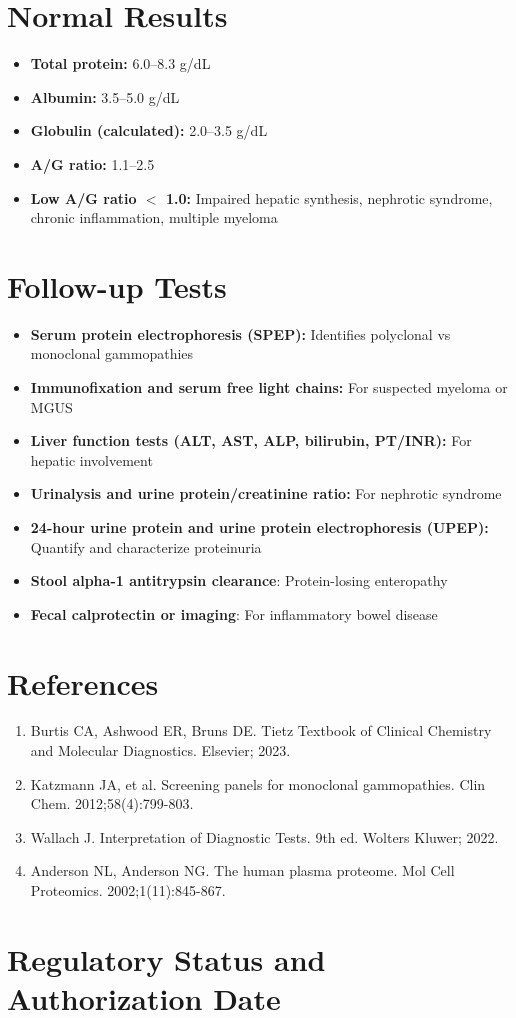 \section*{Normal Results}
\begin{itemize}
  \item \textbf{Total protein:} 6.0--8.3 g/dL
  \item \textbf{Albumin:} 3.5--5.0 g/dL
  \item \textbf{Globulin (calculated):} 2.0--3.5 g/dL
  \item \textbf{A/G ratio:} 1.1--2.5
  \item \textbf{Low A/G ratio $<$ 1.0:} Impaired hepatic synthesis, nephrotic syndrome, chronic inflammation, multiple myeloma
\end{itemize}

\section*{Follow-up Tests}
\begin{itemize}
  \item \textbf{Serum protein electrophoresis (SPEP):} Identifies polyclonal vs monoclonal gammopathies
  \item \textbf{Immunofixation and serum free light chains:} For suspected myeloma or MGUS
  \item \textbf{Liver function tests (ALT, AST, ALP, bilirubin, PT/INR):} For hepatic involvement
  \item \textbf{Urinalysis and urine protein/creatinine ratio:} For nephrotic syndrome
  \item \textbf{24-hour urine protein and urine protein electrophoresis (UPEP):} Quantify and characterize proteinuria
  \item \textbf{Stool alpha-1 antitrypsin clearance}: Protein-losing enteropathy
  \item \textbf{Fecal calprotectin or imaging}: For inflammatory bowel disease
\end{itemize}

\section*{References}
\begin{enumerate}
  \item Burtis CA, Ashwood ER, Bruns DE. Tietz Textbook of Clinical Chemistry and Molecular Diagnostics. Elsevier; 2023.
  \item Katzmann JA, et al. Screening panels for monoclonal gammopathies. Clin Chem. 2012;58(4):799-803.
  \item Wallach J. Interpretation of Diagnostic Tests. 9th ed. Wolters Kluwer; 2022.
  \item Anderson NL, Anderson NG. The human plasma proteome. Mol Cell Proteomics. 2002;1(11):845-867.
\end{enumerate}

\clearpage
\section*{Regulatory Status and Authorization Date}

\clearpage
